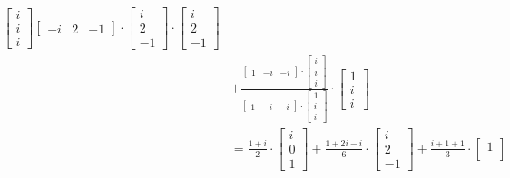\documentclass[11pt, a4paper, norsk]{NTNUoving}
\begin{document}
\begin{oppgave}
\begin{punkt}
\begin{align*}
{\begin{bmatrix}
           i \\
           i \\
           i
       \end{bmatrix}}{\begin{bmatrix}
       -i & 2 & -1
       \end{bmatrix} \cdot \begin{bmatrix}
           i \\
           2 \\
           -1
       \end{bmatrix}} \cdot \begin{bmatrix}
           i \\
           2 \\
           -1
       \end{bmatrix} 
       \\
       &+ \frac{\begin{bmatrix}
       1 & -i & -i
       \end{bmatrix} \cdot \begin{bmatrix}
           i \\ 
           i \\
           i
       \end{bmatrix}}{\begin{bmatrix}
       1 & -i & -i
       \end{bmatrix} \cdot \begin{bmatrix}
           1 \\
           i \\
           i
       \end{bmatrix}} \cdot \begin{bmatrix}
           1 \\
           i \\
           i
       \end{bmatrix}
       \\
       &= \frac{1+i}{2} \cdot \begin{bmatrix}
           i \\
           0 \\
           1
       \end{bmatrix} + \frac{1+2i-i}{6} \cdot \begin{bmatrix}
           i \\
           2 \\
           -1
       \end{bmatrix} + \frac{i + 1 + 1}{3} \cdot \begin{bmatrix}
           1 \\

\end{bmatrix}
\end{align*}
\end{punkt}
\end{oppgave}
\end{document}
